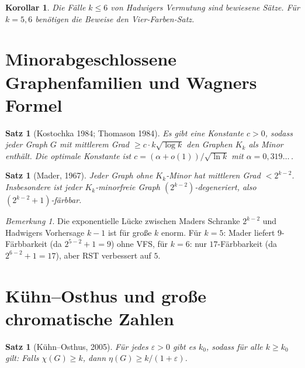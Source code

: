 \documentclass[12pt,a4paper]{amsart}
\newtheorem{satz}[theorem]{Satz}
\newtheorem{korollar}[theorem]{Korollar}
\theoremstyle{definition}
\theoremstyle{remark}
\newtheorem{bemerkung}[theorem]{Bemerkung}
\begin{document}
\begin{korollar}
Die Fälle $k \leq 6$ von Hadwigers Vermutung sind bewiesene Sätze. Für $k = 5, 6$
benötigen die Beweise den Vier-Farben-Satz.
\end{korollar}

\section{Minorabgeschlossene Graphenfamilien und Wagners Formel}

\begin{satz}[Kostochka 1984; Thomason 1984]\label{satz:kostochka}
Es gibt eine Konstante $c > 0$, sodass jeder Graph $G$ mit mittlerem Grad
$\geq c \cdot k \sqrt{\log k}$ den Graphen $K_k$ als Minor enthält. Die optimale
Konstante ist $c = (\alpha + o(1))/\sqrt{\ln k}$ mit $\alpha = 0{,}319\ldots$\,.
\end{satz}

\begin{satz}[Mader, 1967]\label{satz:mader}
Jeder Graph ohne $K_k$-Minor hat mittleren Grad $< 2^{k-2}$. Insbesondere ist jeder
$K_k$-minorfreie Graph $(2^{k-2})$-degeneriert, also $(2^{k-2}+1)$-färbbar.
\end{satz}

\begin{bemerkung}
Die exponentielle Lücke zwischen Maders Schranke $2^{k-2}$ und Hadwigers Vorhersage
$k-1$ ist für große $k$ enorm. Für $k = 5$: Mader liefert $9$-Färbbarkeit (da $2^{5-2}+1 = 9$) ohne VFS,
für $k = 6$: nur $17$-Färbbarkeit (da $2^{6-2}+1 = 17$), aber RST verbessert auf $5$.
\end{bemerkung}

\section{Kühn--Osthus und große chromatische Zahlen}

\begin{satz}[Kühn--Osthus, 2005]\label{satz:KO}
Für jedes $\varepsilon > 0$ gibt es $k_0$, sodass für alle $k \geq k_0$ gilt:
Falls $\chi(G) \geq k$, dann $\eta(G) \geq k/(1+\varepsilon)$.
\end{satz}
\end{document}
